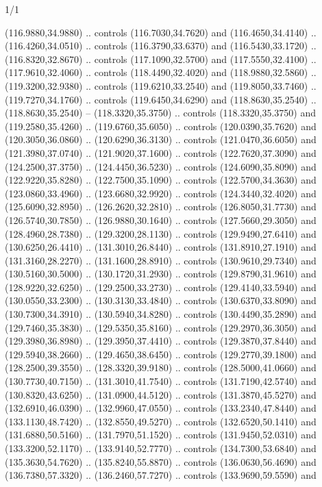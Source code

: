 \begin{flagdescription}{1/1}
\begin{scope}[xshift=0.75\flaglength]
\begin{scope}[scale=0.00209\flagwidth,yshift=134.4mm,xshift=-29.7mm]
\begin{scope}[y=0.80pt, x=0.80pt, yscale=-1, xscale=1, inner sep=0pt, outer sep=0pt,line width=0.0015\flagwidth]
  (116.9880,34.9880) .. controls (116.7030,34.7620) and (116.4650,34.4140) ..
  (116.4260,34.0510) .. controls (116.3790,33.6370) and (116.5430,33.1720) ..
  (116.8320,32.8670) .. controls (117.1090,32.5700) and (117.5550,32.4100) ..
  (117.9610,32.4060) .. controls (118.4490,32.4020) and (118.9880,32.5860) ..
  (119.3200,32.9380) .. controls (119.6210,33.2540) and (119.8050,33.7460) ..
  (119.7270,34.1760) .. controls (119.6450,34.6290) and (118.8630,35.2540) ..
  (118.8630,35.2540) -- (118.3320,35.3750) .. controls (118.3320,35.3750) and
  (119.2580,35.4260) .. (119.6760,35.6050) .. controls (120.0390,35.7620) and
  (120.3050,36.0860) .. (120.6290,36.3130) .. controls (121.0470,36.6050) and
  (121.3980,37.0740) .. (121.9020,37.1600) .. controls (122.7620,37.3090) and
  (124.2500,37.3750) .. (124.4450,36.5230) .. controls (124.6090,35.8090) and
  (122.9220,35.8280) .. (122.7500,35.1090) .. controls (122.5700,34.3630) and
  (123.0860,33.4960) .. (123.6680,32.9920) .. controls (124.3440,32.4020) and
  (125.6090,32.8950) .. (126.2620,32.2810) .. controls (126.8050,31.7730) and
  (126.5740,30.7850) .. (126.9880,30.1640) .. controls (127.5660,29.3050) and
  (128.4960,28.7380) .. (129.3200,28.1130) .. controls (129.9490,27.6410) and
  (130.6250,26.4410) .. (131.3010,26.8440) .. controls (131.8910,27.1910) and
  (131.3160,28.2270) .. (131.1600,28.8910) .. controls (130.9610,29.7340) and
  (130.5160,30.5000) .. (130.1720,31.2930) .. controls (129.8790,31.9610) and
  (128.9220,32.6250) .. (129.2500,33.2730) .. controls (129.4140,33.5940) and
  (130.0550,33.2300) .. (130.3130,33.4840) .. controls (130.6370,33.8090) and
  (130.7300,34.3910) .. (130.5940,34.8280) .. controls (130.4490,35.2890) and
  (129.7460,35.3830) .. (129.5350,35.8160) .. controls (129.2970,36.3050) and
  (129.3980,36.8980) .. (129.3950,37.4410) .. controls (129.3870,37.8440) and
  (129.5940,38.2660) .. (129.4650,38.6450) .. controls (129.2770,39.1800) and
  (128.2500,39.3550) .. (128.3320,39.9180) .. controls (128.5000,41.0660) and
  (130.7730,40.7150) .. (131.3010,41.7540) .. controls (131.7190,42.5740) and
  (130.8320,43.6250) .. (131.0900,44.5120) .. controls (131.3870,45.5270) and
  (132.6910,46.0390) .. (132.9960,47.0550) .. controls (133.2340,47.8440) and
  (133.1130,48.7420) .. (132.8550,49.5270) .. controls (132.6520,50.1410) and
  (131.6880,50.5160) .. (131.7970,51.1520) .. controls (131.9450,52.0310) and
  (133.3200,52.1170) .. (133.9140,52.7770) .. controls (134.7300,53.6840) and
  (135.3630,54.7620) .. (135.8240,55.8870) .. controls (136.0630,56.4690) and
  (136.7380,57.3320) .. (136.2460,57.7270) .. controls (133.9690,59.5590) and

\end{scope}
\end{scope}
\end{scope}
\end{flagdescription}

